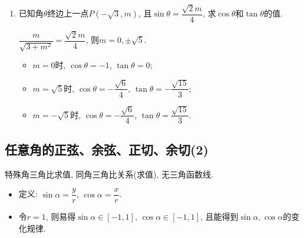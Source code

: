 \begin{enumerate}
\item 已知角$\theta$终边上一点$P(-\sqrt{3},m)$, 且$\sin\theta=\dfrac{\sqrt{2}m}{4}$, 求$\cos\theta$和$\tan\theta$的值. 
\begin{jieda}
$\dfrac{m}{\sqrt{3+m^2}}=\dfrac{\sqrt{2}m}{4}$, 则$m=0,\pm\sqrt{5}$. 
\begin{itemize}
\item $m=0$时, $\cos\theta=-1$, $\tan\theta=0$; 
\item $m=\sqrt{5}$时, $\cos\theta=-\dfrac{\sqrt{6}}{4}$, $\tan\theta=-\dfrac{\sqrt{15}}{3}$; 
\item $m=-\sqrt{5}$时, $\cos\theta=-\dfrac{\sqrt{6}}{4}$, $\tan\theta=\dfrac{\sqrt{15}}{3}$. 
\end{itemize}
\end{jieda}

\end{enumerate}






\subsection{任意角的正弦、余弦、正切、余切(2)}
\zsd 特殊角三角比求值, 同角三角比关系(求值), 无三角函数线. 


\begin{tcolorbox}
\begin{itemize}
\item 定义: $\sin\alpha=\dfrac{y}{r}$, $\cos\alpha=\dfrac{x}{r}$. 
\item 令$r=1$, 则易得$\sin\alpha\in[-1,1]$, $\cos\alpha\in[-1,1]$, 且能得到$\sin\alpha,\cos\alpha$的变化规律. 
\end{itemize}
\end{tcolorbox}



